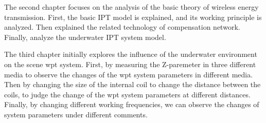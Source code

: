 The second chapter focuses on the analysis of the basic theory of wireless energy transmission. First, the basic IPT model is explained, and its working principle is analyzed. Then explained the related technology of compensation network. Finally, analyze the underwater IPT system model.

The third chapter initially explores the influence of the underwater environment on the scene wpt system. First, by measuring the Z-paremeter in three different media to observe the changes of the wpt system parameters in different media. Then by changing the size of the internal coil to change the distance between the coils, to judge the change of the wpt system parameters at different distances. Finally, by changing different working frequencies, we can observe the changes of system parameters under different comments.

